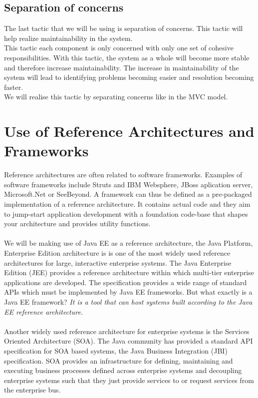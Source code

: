 \documentclass[a4paper]{article}
\begin{document}
\subsection{Separation of concerns}
The last tactic that we will be using is separation of concerns. This tactic will help realize maintainability in the system. 
\\This tactic each component is only concerned with only one set of cohesive responsibilities. With this tactic, the system as a whole will become more stable and therefore increase maintainability. The increase in maintainability of the system will lead to identifying problems becoming easier and resolution becoming faster.
\\We will realise this tactic by separating concerns like in the MVC model.

\section{Use of Reference Architectures and Frameworks}
Reference architectures are often related to software frameworks. Examples of software frameworks include Struts and IBM
Websphere, JBoss aplication server, Microsoft.Net or SeeBeyond.
A framework can thus be defined as a pre-packaged implementation of a reference architecture. It contains actual code and they aim to jump-start application development with a foundation code-base that shapes your architecture and provides utility functions. 
\\\\
We will be making use of Java EE as a reference architecture, the Java Platform, Enterprise Edition architecture is is one of the most widely used reference architectures for large, interactive enterprise systems. The Java Enterprise Edition (JEE) provides a reference architecture within which multi-tier enterprise applications are developed. The specification provides a wide range of standard APIs which must be implemented by Java EE frameworks. But what exactly is a Java EE framework? \textit{It is a tool that can host systems built according to the Java EE reference architecture.}
\\\\
Another widely used reference architecture for enterprise systems is the Services Oriented Architecture (SOA). The Java community has provided a standard API specification for SOA based systems, the Java Business Integration (JBI) specification. SOA provides an infrastructure for defining, maintaining and executing business processes defined across enterprise systems and decoupling enterprise systems such that they just provide services to or request services from the enterprise bus.
\end{document}
